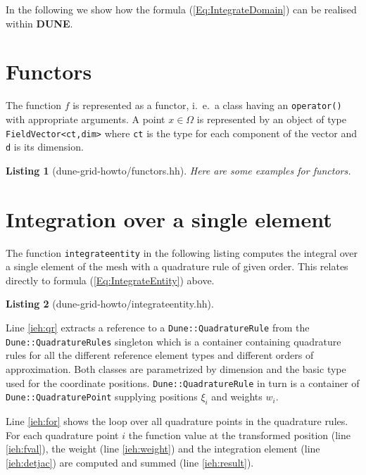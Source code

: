 \documentclass[11pt,a4paper,headinclude,footinclude,DIV16,normalheadings]{scrreprt}
\newcommand{\Dune}{{\sf\bfseries DUNE}\xspace}
\newtheorem{lst}{Listing}
\begin{document}
In the following we show how the formula (\ref{Eq:IntegrateDomain})
can be realised within \Dune.


\section{Functors}

The function $f$ is represented as a functor, i.~e.~a class having an
\lstinline!operator()! with appropriate arguments. A point
$x\in\Omega$ is represented by an object of type
\lstinline!FieldVector<ct,dim>! where \lstinline!ct! is the type for
each component of the vector and \lstinline!d! is its dimension.


\begin{lst}[dune-grid-howto/functors.hh] Here are some examples for functors.


\end{lst}


\section{Integration over a single element}

The function \lstinline!integrateentity! in the following listing
computes the integral over a single element of the mesh with a
quadrature rule of given order. 
This relates directly to formula (\ref{Eq:IntegrateEntity}) above.

\begin{lst}[dune-grid-howto/integrateentity.hh] \mbox{}


\end{lst}

Line \ref{ieh:qr} extracts a reference to a
\lstinline!Dune::QuadratureRule!  from the
\lstinline!Dune::QuadratureRules! singleton which is a container
containing quadrature rules for all the different reference element
types and different orders of approximation.  Both classes are
parametrized by dimension and the basic type used for the coordinate
positions. \lstinline!Dune::QuadratureRule! in turn is a container of
\lstinline!Dune::QuadraturePoint! supplying positions $\xi_i$ and
weights $w_i$.

Line \ref{ieh:for} shows the loop over all quadrature points in the
quadrature rules. For each quadrature point $i$ the function value at
the transformed position (line \ref{ieh:fval}), the weight (line
\ref{ieh:weight}) and the integration element (line \ref{ieh:detjac})
are computed and summed (line \ref{ieh:result}).
\end{document}
